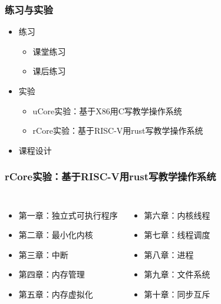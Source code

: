 \documentclass[UTF8]{ctexbeamer}
\begin{document}
    \begin{frame}
        \frametitle{练习与实验}
        \begin{itemize}
            \item 练习
        \begin{itemize}
    		\item 课堂练习
	    	\item 课后练习
        \end{itemize}

            \item 实验
    \begin{itemize}
		\item uCore实验：基于X86用C写教学操作系统
		\item rCore实验：基于RISC-V用rust写教学操作系统
    \end{itemize}
            \item 课程设计
        \end{itemize}
\end{frame}

\begin{frame}
\frametitle{rCore实验：基于RISC-V用rust写教学操作系统}
\begin{columns}
\begin{itemize}
		\item 第一章：独立式可执行程序
		\item 第二章：最小化内核
		\item 第三章：中断
		\item 第四章：内存管理
		\item 第五章：内存虚拟化
\end{itemize}
 
    \begin{itemize}
		\item 第六章：内核线程
		\item 第七章：线程调度
		\item 第八章：进程
		\item 第九章：文件系统
		\item 第十章：同步互斥
    \end{itemize}
\end{columns}
\end{frame}
\end{document}
